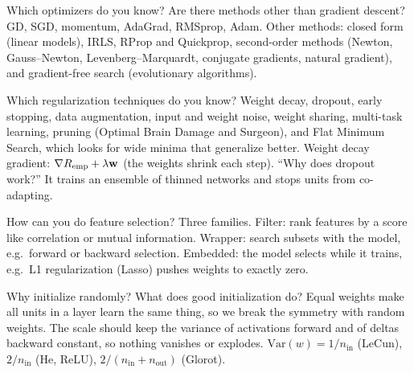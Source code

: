 \begin{qabox}[Hochreiter]{\asked Which optimizers do you know? Are there methods other than gradient descent?}
\ans GD, SGD, momentum, AdaGrad, RMSprop, Adam. Other methods: closed form (linear models),
IRLS, RProp and Quickprop, second-order methods (Newton, Gauss--Newton, Levenberg--Marquardt,
conjugate gradients, natural gradient), and gradient-free search (evolutionary algorithms).
\end{qabox}

\begin{qabox}[Hochreiter]{\asked Which regularization techniques do you know?}
\ans Weight decay, dropout, early stopping, data augmentation, input and weight noise, weight
sharing, multi-task learning, pruning (Optimal Brain Damage and Surgeon), and Flat Minimum Search,
which looks for wide minima that generalize better.
\formula Weight decay gradient: $\nabla R_{\mathrm{emp}}+\lambda\mathbf{w}$ (the weights shrink each step).
\follow ``Why does dropout work?'' It trains an ensemble of thinned networks and stops units from
co-adapting.
\end{qabox}

\begin{qabox}[Hochreiter]{\asked How can you do feature selection?}
\ans Three families. Filter: rank features by a score like correlation or mutual information.
Wrapper: search subsets with the model, e.g.\ forward or backward selection. Embedded: the model
selects while it trains, e.g.\ L1 regularization (Lasso) pushes weights to exactly zero.
\end{qabox}

\begin{qabox}[Klambauer]{\pred Why initialize randomly? What does good initialization do?}
\ans Equal weights make all units in a layer learn the same thing, so we break the symmetry with
random weights. The scale should keep the variance of activations forward and of deltas backward
constant, so nothing vanishes or explodes.
\formula $\mathrm{Var}(w)=1/n_{\mathrm{in}}$ (LeCun), $2/n_{\mathrm{in}}$ (He, ReLU),
$2/(n_{\mathrm{in}}+n_{\mathrm{out}})$ (Glorot).
\end{qabox}

